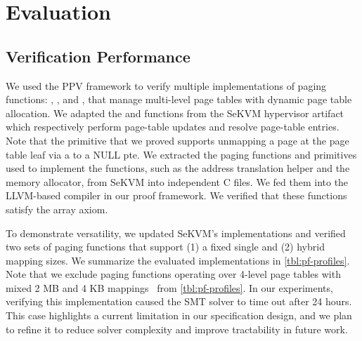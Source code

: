 \section{Evaluation}
\label{sec:eval}

\subsection{Verification Performance}
\label{sec:eval:vpf}

We used the PPV framework to verify multiple implementations of paging functions: , , and , that manage multi-level page tables with dynamic page table allocation. We adapted the  and  functions from the SeKVM hypervisor artifact~\cite{spoq-artifact}
which respectively perform page-table updates and resolve page-table entries. Note that the  primitive that we proved supports unmapping a page at the page table leaf via a  to a NULL pte. We extracted the paging functions and primitives used to implement the functions, such as the address translation helper and the memory allocator, from SeKVM into independent C files. We fed them into the LLVM-based compiler in our proof framework. We verified that these functions satisfy the array axiom.

To demonstrate versatility, we updated SeKVM's implementations and verified two sets of paging functions that support (1) a fixed single and (2) hybrid mapping sizes. We summarize the evaluated implementations in \autoref{tbl:pf-profiles}. %
Note that we exclude paging functions operating over 4-level page tables with mixed 2 MB and 4 KB mappings~\cite{sekvm-artifact-sosp21-pt-refine} from \autoref{tbl:pf-profiles}. In our experiments, verifying this implementation caused the SMT solver to time out after 24 hours. This case highlights a current limitation in our specification design, and we plan to refine it to reduce solver complexity and improve tractability in future work.

